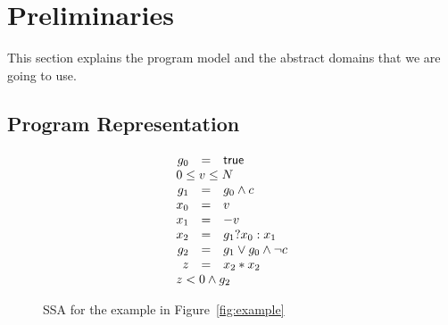 \section{Preliminaries}
This section explains the program model and the abstract domains that
we are going to use.

\subsection{Program Representation}  

\begin{wrapfigure}{r}{3cm}
\[
\begin{array}{rcl}
g_0 &=& \true \\
\multicolumn{3}{l}{0 \leq v\leq N} \\
g_1 &=& g_0\wedge c\\
x_0 &=& v \\
x_1 &=& -v \\
x_2 &=& g_1?x_0:x_1 \\
g_2 &=& g_1 \vee g_0\wedge \neg c\\
z &=& x_2 * x_2 \\
\multicolumn{3}{l}{z<0 \wedge g_2}
\end{array}
\]
\caption{\label{fig:ssa}
SSA for the example in Figure~\ref{fig:example}
}
\end{wrapfigure}

